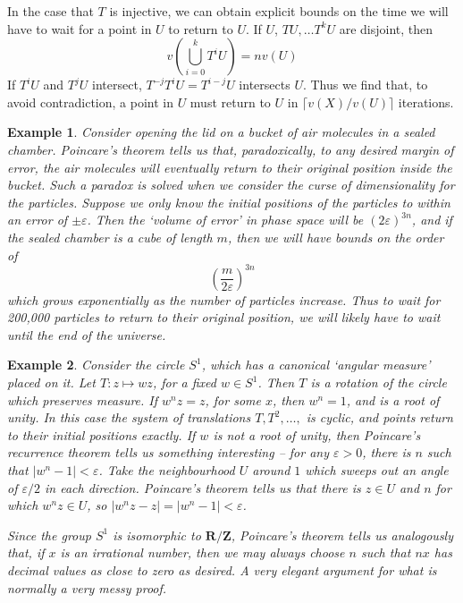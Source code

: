 \documentclass[12pt]{report}
\theoremstyle{plain}
\newtheorem*{example}{Example}
\theoremstyle{definition}
\begin{document}
In the case that $T$ is injective, we can obtain explicit bounds on the time we will have to wait for a point in $U$ to return to $U$. If $U$, $T U, \dots T^k U$ are disjoint, then
%
\[ v(\bigcup_{i = 0}^k T^i U) = n v(U) \]
%
If $T^iU$ and $T^jU$ intersect, $T^{-j}T^iU = T^{i-j}U$ intersects $U$. Thus we find that, to avoid contradiction, a point in $U$ must return to $U$ in $\lceil v(X)/v(U) \rceil$ iterations.

\begin{example}
    Consider opening the lid on a bucket of air molecules in a sealed chamber. Poincare's theorem tells us that, paradoxically, to any desired margin of error, the air molecules will eventually return to their original position inside the bucket. Such a paradox is solved when we consider the curse of dimensionality for the particles. Suppose we only know the initial positions of the particles to within an error of $\pm \varepsilon$. Then the `volume of error' in phase space will be $(2\varepsilon)^{3n}$, and if the sealed chamber is a cube of length $m$, then we will have bounds on the order of
    \[ \left( \frac{m}{2\varepsilon} \right)^{3n} \]
    which grows exponentially as the number of particles increase. Thus to wait for 200,000 particles to return to their original position, we will likely have to wait until the end of the universe.
\end{example}

\begin{example}
    Consider the circle $S^1$, which has a canonical `angular measure' placed on it. Let $T:z \mapsto wz$, for a fixed $w \in S^1$. Then $T$ is a rotation of the circle which preserves measure. If $w^n z = z$, for some $x$, then $w^n = 1$, and is a root of unity. In this case the system of translations $T, T^2, \dots,$ is cyclic, and points return to their initial positions exactly. If $w$ is not a root of unity, then Poincare's recurrence theorem tells us something interesting -- for any $\varepsilon > 0$, there is $n$ such that $|w^n - 1| < \varepsilon$. Take the neighbourhood $U$ around $1$ which sweeps out an angle of $\varepsilon/2$ in each direction. Poincare's theorem tells us that there is $z \in U$ and $n$ for which $w^n z \in U$, so $|w^n z - z| = |w^n - 1| < \varepsilon$.

    Since the group $S^1$ is isomorphic to $\mathbf{R}/\mathbf{Z}$, Poincare's theorem tells us analogously that, if $x$ is an irrational number, then we may always choose $n$ such that $nx$ has decimal values as close to zero as desired. A very elegant argument for what is normally a very messy proof.
\end{example}
\end{document}
